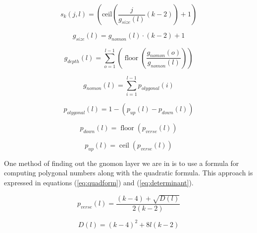 \documentclass[notitlepage]{report}
\begin{document}


\begin{equation}
s_{k}\left(j,l\right)=\left(\text{ceil}\left(\frac{j}{g_{size}\left(l\right)}\left(k-2\right)\right)+1\right)
\end{equation}

\begin{equation}
g_{size}\left(l\right)=g_{nomon}\left(l\right)\cdot\left(k-2\right)+1
\end{equation}

\begin{equation}
    g_{depth}\left(l\right)=\sum_{o=1}^{l-1}\left(\operatorname{floor}\left(\frac{g_{nomon}\left(o\right)}{g_{nomon}\left(l\right)}\right)\right)
\end{equation}

\begin{equation}
    g_{nomon}\left(l\right)=\sum_{i=1}^{l-1}p_{olygonal}\left(i\right)
\end{equation}

\begin{equation}
    p_{olygonal}\left(l\right)=1-\left(p_{up}\left(l\right)-p_{down}\left(l\right)\right)
\end{equation}

\begin{equation}
p_{down}\left(l\right)=\operatorname{floor}\left(p_{verse}\left(l\right)\right)
\end{equation}

\begin{equation}
p_{up}\left(l\right)=\operatorname{ceil}\left(p_{verse}\left(l\right)\right)
\end{equation}

One method of finding out the gnomon layer we are in is to use a formula for computing polygonal numbers along with the quadratic formula. This approach is expressed in equations (\ref{eq:quadform}) and (\ref{eq:determinant}).

\begin{equation}
    p_{verse}\left(l\right)=\frac{\left(k-4\right)+\sqrt{D\left(l\right)}}{2\left(k-2\right)}
     \label{eq:quadform}
\end{equation}

\begin{equation}
    D\left(l\right)=\left(k-4\right)^{2}+8l\left(k-2\right)
    \label{eq:determinant}
\end{equation}
\end{document}
